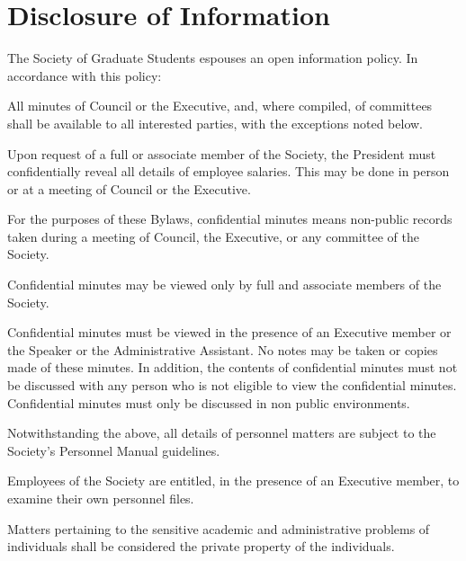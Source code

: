 \section{Disclosure of Information}
The Society of Graduate Students espouses an open information policy. In accordance with this policy:
\begin{longenum}[ label*=\thesection.\arabic*., align=left]
	\item All minutes of Council or the Executive, and, where compiled, of committees shall be available to all interested parties, with the exceptions noted below.
    \item Upon request of a full or associate member of the Society, the  President must confidentially reveal all details of employee salaries. This may be done  in person  or at a meeting of Council or the Executive.
    \item For the purposes of these Bylaws, confidential minutes means non-public records taken during a meeting of Council, the Executive, or any committee of the Society.
    \item Confidential minutes may be viewed only by full and associate members of the Society.
    \item Confidential minutes must be viewed in the presence of an Executive member or the Speaker or the Administrative Assistant. No notes may be taken or copies made of these minutes. In addition, the contents of confidential minutes must not be discussed with any person who is not eligible to view the confidential minutes. Confidential minutes must only be discussed in non public environments.
    \item Notwithstanding the above, all details of personnel matters are subject to the Society's Personnel Manual guidelines.
    \item Employees of the Society are entitled, in the presence of an Executive member, to examine their own personnel files.
    \item Matters pertaining to the sensitive academic and administrative problems of individuals shall be considered the private property of the individuals.
    \end{longenum}
\newpage

